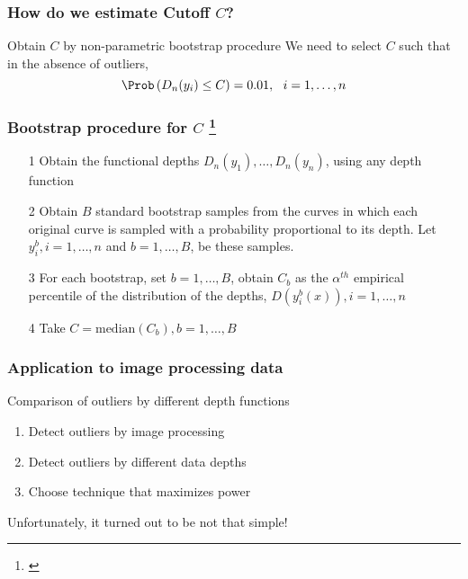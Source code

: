 \documentclass[10pt,dvipsnames,table]{beamer}
\begin{document}
\begin{frame}
\frametitle{How do we estimate Cutoff $C$?}
\Large
\begin{block}{Obtain $C$ by non-parametric bootstrap procedure}
We need to select $C$ such that in the absence of outliers, \[ \Prob\left( D_n(y_i) \leq C\right) = 0.01,\ \ i = 1, \dots, n \]
\end{block}

\end{frame}

\begin{frame}
\frametitle{Bootstrap procedure for $C$ \footnote{\cite{Febrero-Bande_etal_2007_Environmetrics}}}
\begin{enumerate}
\item[1] Obtain the functional depths $D_n(y_1), \dots, D_n(y_n)$, using any depth function
\pause
\item[2] Obtain $B$ standard bootstrap samples from the curves in which each original curve is sampled with a probability proportional to its depth. Let $y_i^b, i = 1, \dots, n$ and $b = 1, \dots, B$, be these samples.
\pause
\item[3] For each bootstrap, set $b = 1, \dots, B$, obtain $C_b$ as the $\alpha^{th}$ empirical percentile of the distribution of the depths, $D(y_i^b(x)), i = 1, \dots, n$
\pause
\item[4] Take $C = \text{median}(C_b), b = 1, \dots, B$ 
\end{enumerate}
\end{frame}

\begin{frame}
\frametitle{Application to image processing data}
\Large
\begin{block}{Comparison of outliers by different depth functions}
\begin{enumerate}
\item Detect outliers by image processing
\item Detect outliers by different data depths
\item Choose technique that maximizes power
\end{enumerate}
\end{block}

Unfortunately, it turned out to be not that simple!
\end{frame}
\end{document}
